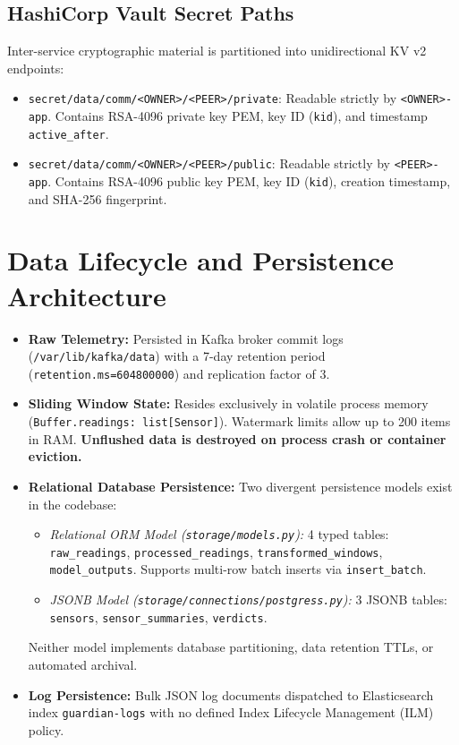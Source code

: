 \documentclass[10pt,a4paper]{report}
\begin{document}
\subsection{HashiCorp Vault Secret Paths}
Inter-service cryptographic material is partitioned into unidirectional KV v2 endpoints:
\begin{itemize}[leftmargin=*]
  \item \texttt{secret/data/comm/<OWNER>/<PEER>/private}: Readable strictly by \texttt{<OWNER>-app}. Contains RSA-4096 private key PEM, key ID (\texttt{kid}), and timestamp \texttt{active\_after}.
  \item \texttt{secret/data/comm/<OWNER>/<PEER>/public}: Readable strictly by \texttt{<PEER>-app}. Contains RSA-4096 public key PEM, key ID (\texttt{kid}), creation timestamp, and SHA-256 fingerprint.
\end{itemize}

\section{Data Lifecycle and Persistence Architecture}
\begin{itemize}[leftmargin=*]
  \item \textbf{Raw Telemetry:} Persisted in Kafka broker commit logs (\texttt{/var/lib/kafka/data}) with a 7-day retention period (\texttt{retention.ms=604800000}) and replication factor of 3.
  \item \textbf{Sliding Window State:} Resides exclusively in volatile process memory (\texttt{Buffer.readings: list[Sensor]}). Watermark limits allow up to 200 items in RAM. \textbf{Unflushed data is destroyed on process crash or container eviction.}
  \item \textbf{Relational Database Persistence:} Two divergent persistence models exist in the codebase:
  \begin{itemize}
    \item \textit{Relational ORM Model (\texttt{storage/models.py}):} 4 typed tables: \texttt{raw\_readings}, \texttt{processed\_readings}, \texttt{transformed\_windows}, \texttt{model\_outputs}. Supports multi-row batch inserts via \texttt{insert\_batch}.
    \item \textit{JSONB Model (\texttt{storage/connections/postgress.py}):} 3 JSONB tables: \texttt{sensors}, \texttt{sensor\_summaries}, \texttt{verdicts}.
  \end{itemize}
  Neither model implements database partitioning, data retention TTLs, or automated archival.
  \item \textbf{Log Persistence:} Bulk JSON log documents dispatched to Elasticsearch index \texttt{guardian-logs} with no defined Index Lifecycle Management (ILM) policy.
\end{itemize}
\end{document}
